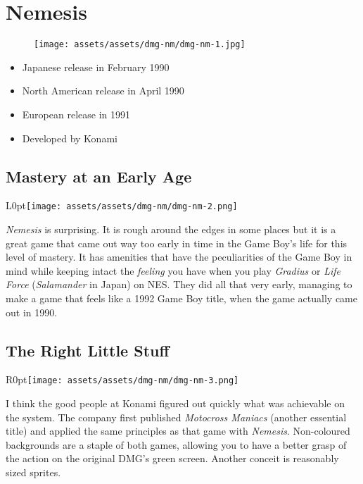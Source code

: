 \documentclass{book}
\begin{document}
\chapter*{Nemesis}
\vspace{\baselineskip}\begin{figure}[H]{\texttt{[image: assets/assets/dmg-nm/dmg-nm-1.jpg]}}\end{figure}\vspace{\baselineskip}
\begin{itemize}[left=0pt, nosep]
\item Japanese release in February 1990
\item North American release in April 1990
\item European release in 1991
\item Developed by Konami

\end{itemize}
\newpage\FloatBarrier\section*{Mastery at an Early Age}
\begin{wrapfigure}{L}{0pt}{\texttt{[image: assets/assets/dmg-nm/dmg-nm-2.png]}}\end{wrapfigure}\noindent
\emph{Nemesis} is surprising. It is rough around the edges in some places but it is a great game that came out way too early in time in the Game Boy’s life for this level of mastery. It has amenities that have the peculiarities of the Game Boy in mind while keeping intact the \emph{feeling} you have when you play \emph{Gradius} or \emph{Life Force} (\emph{Salamander} in Japan) on NES. They did all that very early, managing to make a game that feels like a 1992 Game Boy title, when the game actually came out in 1990.\par
\FloatBarrier\section*{The Right Little Stuff}
\begin{wrapfigure}{R}{0pt}{\texttt{[image: assets/assets/dmg-nm/dmg-nm-3.png]}}\end{wrapfigure}
I think the good people at Konami figured out quickly what was achievable on the system. The company first published \emph{Motocross Maniacs} (another essential title) and applied the same principles as that game with \emph{Nemesis}. Non-coloured backgrounds are a staple of both games, allowing you to have a better grasp of the action on the original DMG’s green screen. Another conceit is reasonably sized sprites.\par
\end{document}
